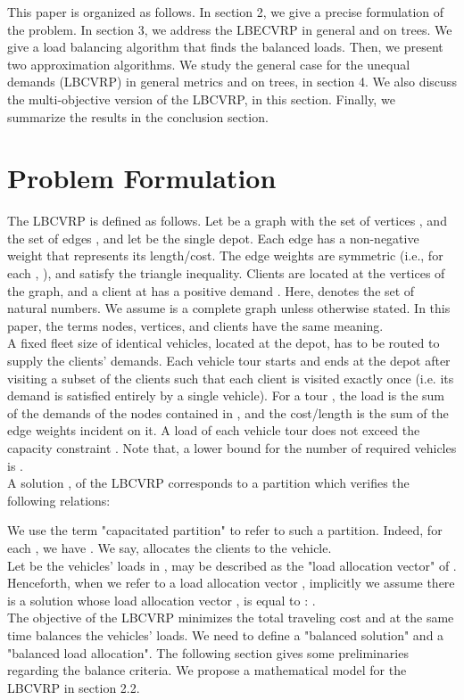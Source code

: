 \indent  This paper is organized as follows. In section 2, we give a precise formulation of the problem. In section 3, we address the LBECVRP in general and on trees. We give a load balancing algorithm that finds the balanced loads. Then, we present two approximation algorithms. We study the general case for the unequal demands (LBCVRP) in general metrics and on trees, in section 4. We also discuss the multi-objective version of the LBCVRP, in this section. Finally, we summarize the results in the conclusion section.
\section{Problem Formulation}
\indent The LBCVRP is defined as follows. Let  be a graph with the set of  vertices , and the set of edges , and let  be the single depot. Each edge  has a non-negative weight  that represents its length/cost. The edge weights are symmetric (i.e., for each , ), and satisfy the triangle inequality. Clients are located at the vertices of the graph, and a client at  has a positive demand . Here,  denotes the set of natural numbers. We assume  is a complete graph unless otherwise stated. In this paper, the terms nodes, vertices, and clients have the same meaning.\\
\indent A fixed fleet size of  identical vehicles, located at the depot, has to be routed to supply the clients' demands. Each vehicle tour starts and ends at the depot after visiting a subset of the clients such that each client is visited exactly once (i.e. its demand is satisfied entirely by a single vehicle). For a tour , the load  is the sum of the demands of the nodes contained in , and the cost/length  is the sum of the edge weights incident on it. A load of each vehicle tour does not exceed the capacity constraint . Note that, a lower bound for the number of required vehicles is .\\
\indent A solution , of the LBCVRP corresponds to a partition  which verifies the following relations:

\noindent We use the term "capacitated partition" to refer to such a partition. Indeed, for each , we have . We say,  allocates the clients  to the  vehicle.\\
\indent Let  be the vehicles' loads in ,  may be described as the "load allocation vector" of . Henceforth, when we refer to a load allocation vector , implicitly we assume there is a solution  whose load allocation vector , is equal to : . \\
\indent The objective of the LBCVRP minimizes the total traveling cost and at the same time balances the vehicles' loads. We need to define a "balanced solution" and a "balanced load allocation". The following section gives some preliminaries regarding the balance criteria. We propose a mathematical model for the LBCVRP in section 2.2.
